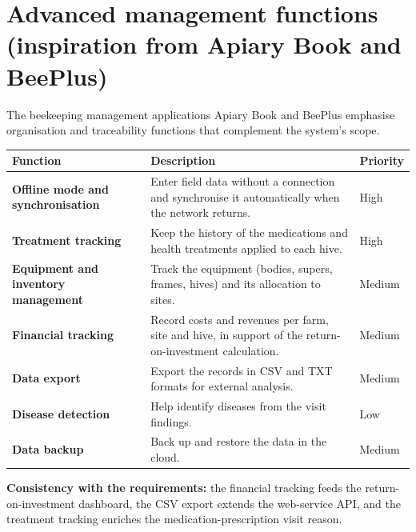 \section{Advanced management functions (inspiration from Apiary Book and BeePlus)}
The beekeeping management applications Apiary Book and BeePlus emphasise
organisation and traceability functions that complement the system's scope.
\begin{xltabular}{\textwidth}{>{\bfseries}p{4.2cm} X C{2.1cm}}
\toprule
\textbf{Function} & \textbf{Description} & \textbf{Priority} \\
\midrule
\endhead
Offline mode and synchronisation & Enter field data without a connection and synchronise it automatically when the network returns. & High \\
Treatment tracking & Keep the history of the medications and health treatments applied to each hive. & High \\
Equipment and inventory management & Track the equipment (bodies, supers, frames, hives) and its allocation to sites. & Medium \\
Financial tracking & Record costs and revenues per farm, site and hive, in support of the return-on-investment calculation. & Medium \\
Data export & Export the records in CSV and TXT formats for external analysis. & Medium \\
Disease detection & Help identify diseases from the visit findings. & Low \\
Data backup & Back up and restore the data in the cloud. & Medium \\
\bottomrule
\end{xltabular}
\begin{encadre}
\textbf{Consistency with the requirements:} the financial tracking feeds the
return-on-investment dashboard, the CSV export extends the web-service API, and
the treatment tracking enriches the medication-prescription visit reason.
\end{encadre}

